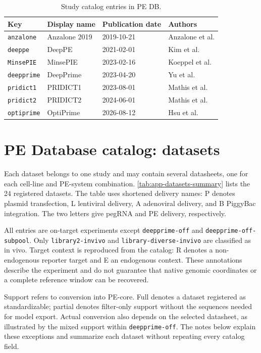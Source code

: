 \documentclass{article}
\begin{document}
\begin{table}[ht]
    \centering
    \small
    \begin{tabular}{@{}llll@{}}
        \hline
        Key & Display name & Publication date & Authors \\
        \hline
        \nolinkurl{anzalone}   & Anzalone 2019 & 2019-10-21 & Anzalone et al. \\
        \nolinkurl{deeppe}     & DeepPE    & 2021-02-01 & Kim et al. \\
        \nolinkurl{MinsePIE}   & MinsePIE  & 2023-02-16 & Koeppel et al. \\
        \nolinkurl{deepprime}  & DeepPrime & 2023-04-20 & Yu et al. \\
        \nolinkurl{pridict1}   & PRIDICT1  & 2023-08-01 & Mathis et al. \\
        \nolinkurl{pridict2}   & PRIDICT2  & 2024-06-01 & Mathis et al. \\
        \nolinkurl{optiprime}  & OptiPrime & 2026-08-12 & Hsu et al. \\
        \hline
    \end{tabular}
    \caption{Study catalog entries in PE DB.}
    \label{tab:app-studies}
\end{table}

\section{PE Database catalog: datasets}
\label{app:datasets}

Each dataset belongs to one study and may contain several datasheets, one for each cell-line and PE-system combination. \autoref{tab:app-datasets-summary} lists the 24 registered datasets. The table uses shortened delivery names: P denotes plasmid transfection, L lentiviral delivery, A adenoviral delivery, and B PiggyBac integration. The two letters give pegRNA and PE delivery, respectively.

All entries are on-target experiments except \nolinkurl{deepprime-off} and \nolinkurl{deepprime-off-subpool}. Only \nolinkurl{library2-invivo} and \nolinkurl{library-diverse-invivo} are classified as in vivo. Target context is reproduced from the catalog: R denotes a non-endogenous reporter target and E an endogenous context. These annotations describe the experiment and do not guarantee that native genomic coordinates or a complete reference window can be recovered.

Support refers to conversion into PE-core. Full denotes a dataset registered as standardizable; partial denotes filter-only support without the sequences needed for model export. Actual conversion also depends on the selected datasheet, as illustrated by the mixed support within \nolinkurl{deepprime-off}. The notes below explain these exceptions and summarize each dataset without repeating every catalog field.
\end{document}
